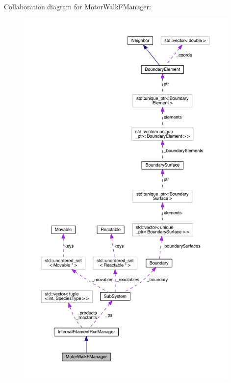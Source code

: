 Collaboration diagram for Motor\+Walk\+F\+Manager\+:\nopagebreak
\begin{figure}[H]
\begin{center}
\leavevmode
\includegraphics[height=550pt]{classMotorWalkFManager__coll__graph}
\end{center}
\end{figure}
